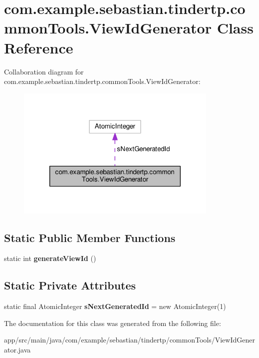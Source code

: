 \hypertarget{classcom_1_1example_1_1sebastian_1_1tindertp_1_1commonTools_1_1ViewIdGenerator}{}\section{com.\+example.\+sebastian.\+tindertp.\+common\+Tools.\+View\+Id\+Generator Class Reference}
\label{classcom_1_1example_1_1sebastian_1_1tindertp_1_1commonTools_1_1ViewIdGenerator}


Collaboration diagram for com.\+example.\+sebastian.\+tindertp.\+common\+Tools.\+View\+Id\+Generator\+:\nopagebreak
\begin{figure}[H]
\begin{center}
\leavevmode
\includegraphics[width=274pt]{classcom_1_1example_1_1sebastian_1_1tindertp_1_1commonTools_1_1ViewIdGenerator__coll__graph}
\end{center}
\end{figure}
\subsection*{Static Public Member Functions}
\begin{DoxyCompactItemize}
\item 
static int {\bfseries generate\+View\+Id} ()\hypertarget{classcom_1_1example_1_1sebastian_1_1tindertp_1_1commonTools_1_1ViewIdGenerator_aa738b160f35bd54b5c8ac42dbe5a2291}{}\label{classcom_1_1example_1_1sebastian_1_1tindertp_1_1commonTools_1_1ViewIdGenerator_aa738b160f35bd54b5c8ac42dbe5a2291}

\end{DoxyCompactItemize}
\subsection*{Static Private Attributes}
\begin{DoxyCompactItemize}
\item 
static final Atomic\+Integer {\bfseries s\+Next\+Generated\+Id} = new Atomic\+Integer(1)\hypertarget{classcom_1_1example_1_1sebastian_1_1tindertp_1_1commonTools_1_1ViewIdGenerator_ad529b1023647039f3482f679c5a967c6}{}\label{classcom_1_1example_1_1sebastian_1_1tindertp_1_1commonTools_1_1ViewIdGenerator_ad529b1023647039f3482f679c5a967c6}

\end{DoxyCompactItemize}


The documentation for this class was generated from the following file\+:\begin{DoxyCompactItemize}
\item 
app/src/main/java/com/example/sebastian/tindertp/common\+Tools/View\+Id\+Generator.\+java\end{DoxyCompactItemize}
